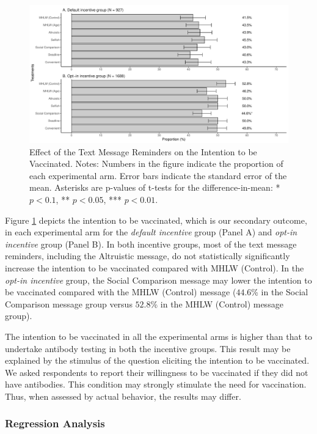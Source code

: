 \documentclass[
  11pt,
  a4paper
]{article}
\begin{document}
\begin{figure}[t]
\includegraphics{Main-Document-LaTeX_files/figure-latex/ttest-int-vacc-1} \caption{Effect of the Text Message Reminders on the Intention to be Vaccinated. Notes: Numbers in the figure indicate the proportion of each experimental arm. Error bars indicate the standard error of the mean. Asterisks are p-values of t-tests for the difference-in-mean: * $p < 0.1$, ** $p < 0.05$, *** $p < 0.01$.}\label{fig:ttest-int-vacc}
\end{figure}

Figure \ref{fig:ttest-int-vacc} depicts the intention to be vaccinated, which is our secondary outcome, in each experimental arm for the \emph{default incentive} group (Panel A) and \emph{opt-in incentive} group (Panel B). In both incentive groups, most of the text message reminders, including the Altruistic message, do not statistically significantly increase the intention to be vaccinated compared with MHLW (Control). In the \emph{opt-in incentive} group, the Social Comparison message may lower the intention to be vaccinated compared with the MHLW (Control) message (\(44.6\)\% in the Social Comparison message group versus \(52.8\)\% in the MHLW (Control) message group).

The intention to be vaccinated in all the experimental arms is higher than that to undertake antibody testing in both the incentive groups. This result may be explained by the stimulus of the question eliciting the intention to be vaccinated. We asked respondents to report their willingness to be vaccinated if they did not have antibodies. This condition may strongly stimulate the need for vaccination. Thus, when assessed by actual behavior, the results may differ.

\hypertarget{regression-analysis}{%
\subsubsection{Regression Analysis}\label{regression-analysis}}
\end{document}
